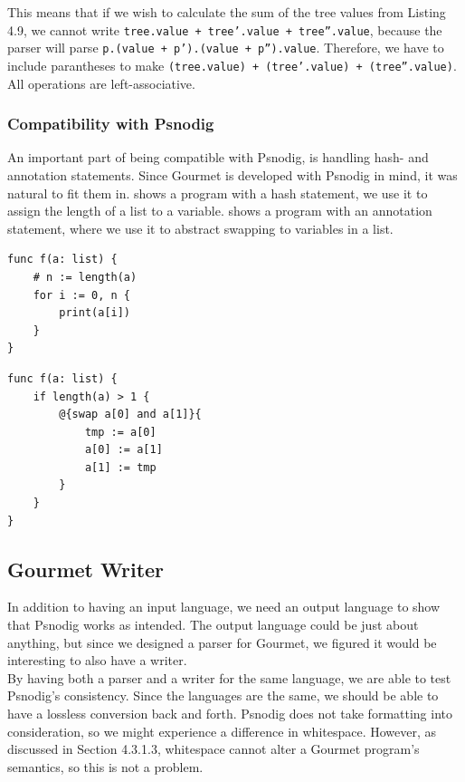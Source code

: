 This means that if we wish to calculate the sum of the tree values from Listing 4.9, we cannot write \texttt{tree.value + tree'.value + tree''.value}, because the parser will parse \texttt{p.(value + p').(value + p'').value}. Therefore, we have to include parantheses to make \texttt{(tree.value) + (tree'.value) + (tree''.value)}. \\

All operations are left-associative.

\subsubsection{Compatibility with Psnodig}

An important part of being compatible with Psnodig, is handling hash- and annotation statements. Since Gourmet is developed with Psnodig in mind, it was natural to fit them in.  shows a program with a hash statement, we use it to assign the length of a list to a variable.  shows a program with an annotation statement, where we use it to abstract swapping to variables in a list. \\

\begin{lstlisting}[caption={A Gourmet program with a hash statement}, captionpos=b, label={hashStmtInAction}]
func f(a: list) {
    # n := length(a)
    for i := 0, n {
        print(a[i])
    }
}
\end{lstlisting}

\begin{lstlisting}[caption={A Gourmet program with an annotation statement}, captionpos=b, label={antStmtInAction}]
func f(a: list) {
    if length(a) > 1 {
        @{swap a[0] and a[1]}{
            tmp := a[0]
            a[0] := a[1]
            a[1] := tmp
        }
    }
}
\end{lstlisting}

\subsection{Gourmet Writer}

In addition to having an input language, we need an output language to show that Psnodig works as intended. The output language could be just about anything, but since we designed a parser for Gourmet, we figured it would be interesting to also have a writer. \\

By having both a parser and a writer for the same language, we are able to test Psnodig's consistency. Since the languages are the same, we should be able to have a lossless conversion back and forth. Psnodig does not take formatting into consideration, so we might experience a difference in whitespace. However, as discussed in Section 4.3.1.3, whitespace cannot alter a Gourmet program's semantics, so this is not a problem. \\

